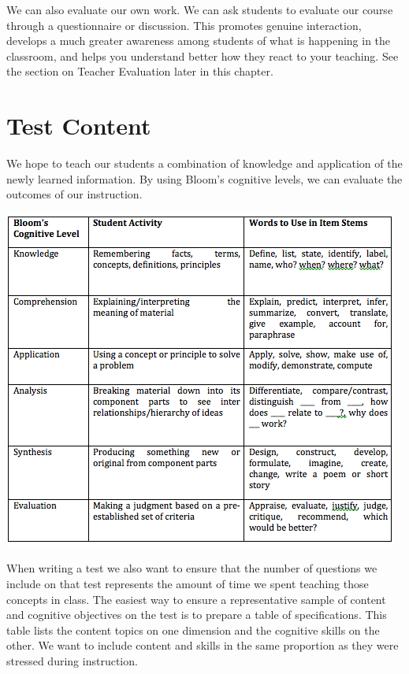 We can also evaluate our own work.  We can ask students to evaluate our course through a questionnaire or discussion.  This promotes genuine interaction, develops a much greater awareness among students of what is happening in the classroom, and helps you understand better how they react to your teaching. See the section on Teacher Evaluation later in this chapter.

\section{Test Content}

We hope to teach our students a combination of knowledge and application of the newly learned information.  By using Bloom's cognitive levels, we can evaluate the outcomes of our instruction.

\begin{center}
\includegraphics[scale=1]{./img/picture-8.png} 
\end{center}

When writing a test we also want to ensure that the number of questions we include on that test represents the amount of time we spent teaching those concepts in class.  The easiest way to ensure a representative sample of content and cognitive objectives on the test is to prepare a table of specifications. This table lists the content topics on one dimension and the cognitive skills on the other. We want to include content and skills in the same proportion as they were stressed during instruction.\\

